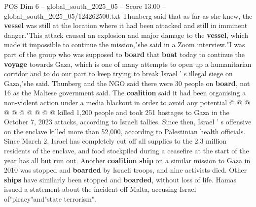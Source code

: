 \begin{textsample}{POS Dim 6 – global\_south\_2025\_05 – Score 13.00 – global\_south\_2025\_05/124262500.txt}
Thunberg said that as far as she knew, the \textbf{vessel} was still at the location where it had been attacked and still in imminent danger."This attack caused an explosion and major damage to the \textbf{vessel}, which made it impossible to continue the mission,"she said in a Zoom interview."I was part of the group who was supposed to \textbf{board} that \textbf{boat} today to continue the \textbf{voyage} towards Gaza, which is one of many attempts to open up a humanitarian corridor and to do our part to keep trying to break Israel ' s illegal siege on Gaza,"she said.
Thunberg and the NGO said there were 30 people on \textbf{board}, not 16 as the Maltese government said.
The \textbf{coalition} said it had been organising a non-violent action under a media blackout in order to avoid any potential @ @ @ @ @ @ @ @ @ @ killed 1,200 people and took 251 hostages to Gaza in the October 7, 2023 attacks, according to Israeli tallies.
Since then, Israel ' s offensive on the enclave killed more than 52,000, according to Palestinian health officials.
Since March 2, Israel has completely cut off all supplies to the 2.3 million residents of the enclave, and food stockpiled during a ceasefire at the start of the year has all but run out.
Another \textbf{coalition} \textbf{ship} on a similar mission to Gaza in 2010 was stopped and \textbf{boarded} by Israeli troops, and nine activists died.
Other \textbf{ships} have similarly been stopped and \textbf{boarded}, without loss of life.
Hamas issued a statement about the incident off Malta, accusing Israel of"piracy"and"state terrorism".

\end{textsample}
